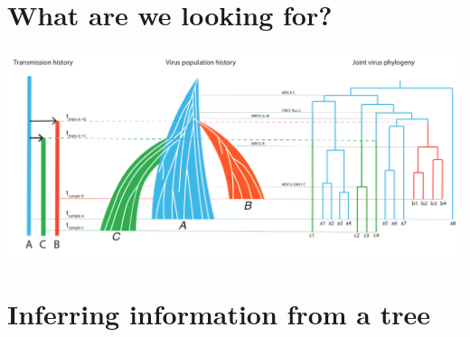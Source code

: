 \documentclass[aspectratio=169]{beamer}
\begin{document}
\section{What are we looking for?} %

\begin{frame} \frametitle{\insertsection}
    \begin{center}
        \centering\includegraphics[width=\textwidth]{images/thomas-figure}
    \end{center}
\end{frame}

\section{Inferring information from a tree}
\end{document}
